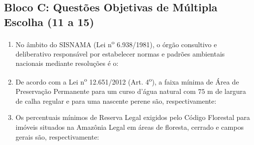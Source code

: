 \subsection*{Bloco C: Questões Objetivas de Múltipla Escolha (11 a 15)}
\begin{enumerate}[leftmargin=1.8em, itemsep=6pt, start=11]
  \item No âmbito do SISNAMA (Lei n\textsuperscript{o} 6.938/1981), o órgão consultivo e deliberativo responsável por estabelecer normas e padrões ambientais nacionais mediante resoluções é o:
  \espacoResolucao[1.2cm]

  \item De acordo com a Lei n\textsuperscript{o} 12.651/2012 (Art. 4\textsuperscript{o}), a faixa mínima de Área de Preservação Permanente para um curso d'água natural com $75\text{ m}$ de largura de calha regular e para uma nascente perene são, respectivamente:
  \espacoResolucao[1.2cm]

  \item Os percentuais mínimos de Reserva Legal exigidos pelo Código Florestal para imóveis situados na Amazônia Legal em áreas de floresta, cerrado e campos gerais são, respectivamente:
  \espacoResolucao[1.2cm]


\end{enumerate}
